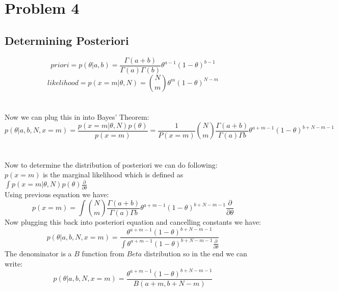 \documentclass{article}
\begin{document}
\section{Problem 4}
\subsection{Determining Posteriori}
\begin{equation}
priori = p(\theta | a, b) = \frac{\Gamma(a + b)}{\Gamma(a)\Gamma(b)} \theta^{a - 1}(1-\theta)^{b - 1} 
\end{equation}
\begin{equation}
    likelihood = p(x = m|\theta, N) = {N\choose m}\theta^m(1-\theta)^{N-m}   
\end{equation}
\\\\
Now we can plug this in into Bayes' Theorem:
\begin{equation}
    p(\theta | a, b, N, x = m) = \frac{ p(x = m|\theta, N) p(\theta)}{p(x=m)} 
    = \frac{1}{P(x=m)} {N\choose m} \frac{\Gamma(a + b)}{\Gamma(a)\Gamma{b}} \theta^{a + m - 1}(1-\theta)^{b + N - m - 1}   
\end{equation}\\\\
Now to determine the distribution of posteriori we can do following:\\
$p(x=m)$ is the marginal likelihood which is defined as $\int p(x = m|\theta, N) p(\theta) \frac{\partial}{\partial\theta}$\\
Using previous equation we have: 
\begin{equation}
    p(x=m) =  \int {N\choose m} \frac{\Gamma(a + b)}{\Gamma(a)\Gamma{b}} \theta^{a + m - 1}(1-\theta)^{b + N - m - 1} \frac{\partial}{\partial\theta} 
\end{equation} 
Now plugging this back into posteriori equation and cancelling constants we have:\\
\begin{equation}
    p(\theta | a, b, N, x = m) = \frac{ \theta^{a + m - 1}(1-\theta)^{b + N - m - 1}}{\int \theta^{a + m - 1}(1-\theta)^{b + N - m - 1} \frac{\partial}{\partial\theta} }
\end{equation} 
The denominator is a $B$ function from $Beta$ distribution so in the end we can write:\\
\begin{equation}
p(\theta | a, b, N, x = m) = \frac{ \theta^{a + m - 1}(1-\theta)^{b + N - m - 1}}{B(a+m, b+N-m)}
\end{equation}
\end{document}
